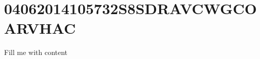 \documentclass{article}
\begin{document}
\section{04062014105732S8SDRAVCWGCOARVHAC}
Fill me with content
\end{document}
